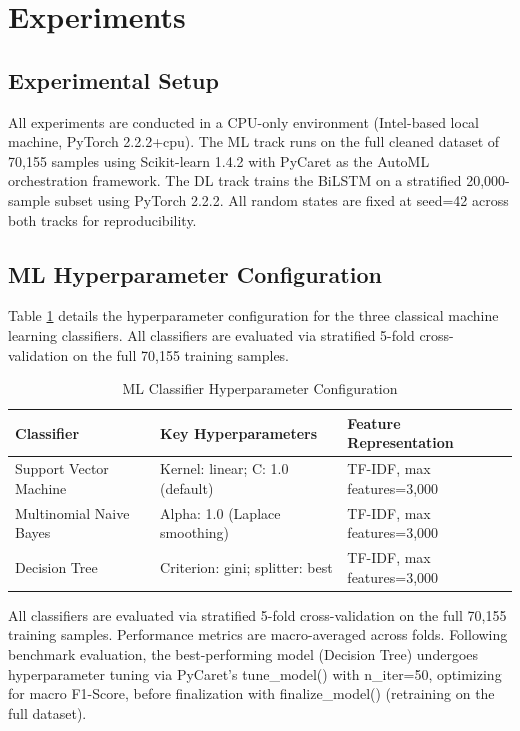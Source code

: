 \documentclass{article}
\begin{document}
\section{Experiments}
\label{sec:experiments}

\subsection{Experimental Setup}
All experiments are conducted in a CPU-only environment (Intel-based local machine, PyTorch 2.2.2+cpu). The ML track runs on the full cleaned dataset of 70,155 samples using Scikit-learn 1.4.2 with PyCaret as the AutoML orchestration framework. The DL track trains the BiLSTM on a stratified 20,000-sample subset using PyTorch 2.2.2. All random states are fixed at seed=42 across both tracks for reproducibility.

\subsection{ML Hyperparameter Configuration}

Table \ref{tab:ml_hyper} details the hyperparameter configuration for the three classical machine learning classifiers. All classifiers are evaluated via stratified 5-fold cross-validation on the full 70,155 training samples.

\begin{table}[H]
\centering
\caption{ML Classifier Hyperparameter Configuration}
\label{tab:ml_hyper}
\begin{tabular}{@{}lll@{}}
\toprule
\textbf{Classifier} & \textbf{Key Hyperparameters} & \textbf{Feature Representation} \\ \midrule
Support Vector Machine & Kernel: linear; C: 1.0 (default) & TF-IDF, max features=3,000 \\
Multinomial Naive Bayes & Alpha: 1.0 (Laplace smoothing) & TF-IDF, max features=3,000 \\
Decision Tree & Criterion: gini; splitter: best & TF-IDF, max features=3,000 \\ \bottomrule
\end{tabular}
\end{table}

All classifiers are evaluated via stratified 5-fold cross-validation on the full 70,155 training samples. Performance metrics are macro-averaged across folds. Following benchmark evaluation, the best-performing model (Decision Tree) undergoes hyperparameter tuning via PyCaret's tune\_model() with n\_iter=50, optimizing for macro F1-Score, before finalization with finalize\_model() (retraining on the full dataset).
\end{document}
